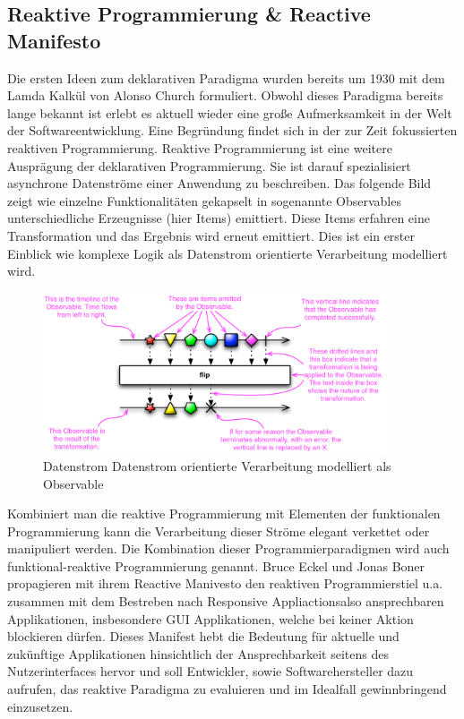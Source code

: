 \documentclass[12pt,oneside,a4paper,bibtotoc,liststotoc]{scrreprt}
\begin{document}
\subsection{Reaktive Programmierung \& Reactive Manifesto}
Die ersten Ideen zum deklarativen Paradigma wurden bereits um 1930 mit dem Lamda Kalkül von Alonso Church formuliert. Obwohl dieses Paradigma bereits lange bekannt ist erlebt es aktuell wieder eine große Aufmerksamkeit in der Welt der Softwareentwicklung. Eine Begründung findet sich in der zur Zeit fokussierten reaktiven Programmierung. Reaktive Programmierung ist eine weitere Ausprägung der deklarativen Programmierung. Sie ist darauf spezialisiert asynchrone Datenströme einer Anwendung zu beschreiben. Das folgende Bild zeigt wie einzelne Funktionalitäten gekapselt in sogenannte Observables unterschiedliche Erzeugnisse (hier Items) emittiert. Diese Items erfahren eine Transformation und das Ergebnis wird erneut emittiert. Dies ist ein erster Einblick wie komplexe Logik als Datenstrom orientierte Verarbeitung modelliert wird.
\begin{figure}[H]
  \begin{centering}
    \includegraphics[width=0.9\textwidth]{img/Observable.png}
    \caption{Datenstrom Datenstrom orientierte Verarbeitung modelliert als Observable \cite[vgl. Abschnitt zu Observable]{rxAllgDoku} }
    \label{Observable}
  \end{centering}
\end{figure}
Kombiniert man die reaktive Programmierung mit Elementen der funktionalen Programmierung kann die Verarbeitung dieser Ströme elegant verkettet oder manipuliert werden. Die Kombination dieser Programmierparadigmen wird auch funktional-reaktive Programmierung genannt.
Bruce Eckel und Jonas Boner propagieren mit ihrem Reactive Manivesto den reaktiven Programmierstiel u.a. zusammen mit dem Bestreben nach \glqq Responsive Appliactions\grqq also ansprechbaren Applikationen, insbesondere GUI Applikationen, welche bei keiner Aktion blockieren dürfen.\cite{heiseReactiveManifesto} Dieses Manifest hebt die Bedeutung für aktuelle und zukünftige Applikationen hinsichtlich der Ansprechbarkeit seitens des Nutzerinterfaces hervor und soll Entwickler, sowie Softwarehersteller dazu aufrufen, das reaktive Paradigma zu evaluieren und im Idealfall gewinnbringend einzusetzen.\cite{reactiveManifesto}
\end{document}
